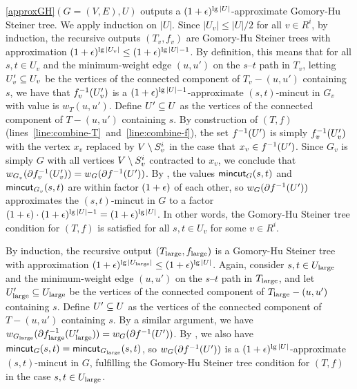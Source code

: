 \BL{}
\ref{approxGH}$(G=(V,E),U)$ outputs a $(1+\epsilon)^{\lg|U|}$-approximate Gomory-Hu Steiner tree.
\EL
\BP
We apply induction on $|U|$. 
Since $|U_v|\le|U|/2$ for all $v\in R^i$, by induction, the recursive outputs $(T_v,f_v)$ are Gomory-Hu Steiner trees with approximation $(1+\epsilon)^{\lg|U_v|}\le(1+\epsilon)^{\lg|U|-1}$.  By definition, this means that for all $s,t\in U_v$ and the minimum-weight edge $(u,u')$ on the $s$--$t$ path in $T_v$, letting $U'_v\subseteq U_v$ be the vertices of the connected component of $T_v-(u,u')$ containing $s$, we have that $f^{-1}_v(U'_v)$ is a $(1+\epsilon)^{\lg|U|-1}$-approximate $(s,t)$-mincut in $G_v$ with value is $w_T(u,u')$. Define $U'\subseteq U$ as the vertices of the connected component of $T-(u,u')$ containing $s$. By construction of $(T,f)$ (lines~\ref{line:combine-T}~and~\ref{line:combine-f}), the set $f^{-1}(U')$ is simply $f^{-1}_v(U'_v)$ with the vertex $x_v$ replaced by $V\setminus S^i_v$ in the case that $x_v\in f^{-1}(U')$. Since $G_v$ is simply $G$ with all vertices $V\setminus S^i_v$ contracted to $x_v$, we conclude that $w_{G_v}(\partial f^{-1}_v(U'_v)) = w_G(\partial f^{-1}(U'))$. By , the values $\textsf{\textup{mincut}}_G(s,t)$ and $\textsf{\textup{mincut}}_{G_v}(s,t)$ are within factor $(1+\epsilon)$ of each other, so $w_G(\partial f^{-1}(U'))$ approximates the $(s,t)$-mincut in $G$ to a factor $(1+\epsilon)\cdot(1+\epsilon)^{\lg|U|-1} = (1+\epsilon)^{\lg|U|}$. In other words, the Gomory-Hu Steiner tree condition for $(T,f)$ is satisfied for all $s,t\in U_v$ for some $v\in R^i$.

By induction, the recursive output $(T_{\textup{large}},f_{\textup{large}})$ is a Gomory-Hu Steiner tree with approximation $(1+\epsilon)^{\lg|U_{\textup{large}}|}\le(1+\epsilon)^{\lg|U|}$. Again, consider $s,t\in U_{\textup{large}}$ and the minimum-weight edge $(u,u')$ on the $s$--$t$ path in $T_{\textup{large}}$, and let $U'_{\textup{large}}\subseteq U_{\textup{large}}$ be the vertices of the connected component of $T_{\textup{large}}-(u,u')$ containing $s$. Define $U'\subseteq U$ as the vertices of the connected component of $T-(u,u')$ containing $s$. By a similar argument, we have $w_{G_{\textup{large}}}(\partial f^{-1}_{\textup{large}}(U'_{\textup{large}})) = w_G(\partial f^{-1}(U'))$. By , we also have $\textsf{\textup{mincut}}_G(s,t)=\textsf{\textup{mincut}}_{G_{\textup{large}}}(s,t)$, so $w_G(\partial f^{-1}(U'))$ is a $(1+\epsilon)^{\lg|U|}$-approximate $(s,t)$-mincut in $G$, fulfilling the Gomory-Hu Steiner tree condition for $(T,f)$ in the case $s,t\in U_{\textup{large}}$.

